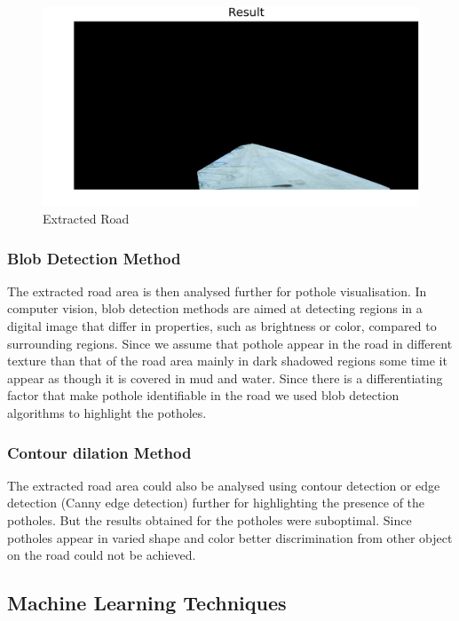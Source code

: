 \documentclass[journal]{IEEEtran}
\begin{document}
\begin{figure}[!htb]
\begin{center}
\includegraphics[scale=0.65]{Images/7_Result.png}
\end{center}
\caption{Extracted Road}
\end{figure}

\newpage

\subsubsection{Blob Detection Method}

The extracted road area is then analysed further for pothole visualisation. In computer vision, blob detection methods are aimed at detecting regions in a digital image that differ in properties, such as brightness or color, compared to surrounding regions. Since we assume that pothole appear in the road in different texture than that of the road area mainly in dark shadowed regions some time it appear as though it is covered in mud and water. Since there is a differentiating factor that make pothole identifiable in the road we used blob detection algorithms to highlight the potholes.

\subsubsection{Contour dilation Method}
The extracted road area could also be analysed using contour detection or edge detection (Canny edge detection) further for highlighting the presence of the potholes. But the results obtained for the potholes were sub\-optimal. Since potholes appear in varied shape and color better discrimination from other object on the road could not be achieved. 

\subsection{Machine Learning Techniques}
\end{document}
